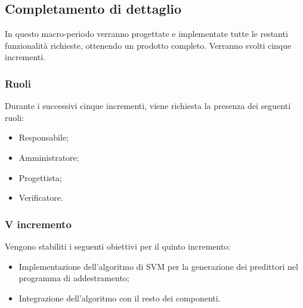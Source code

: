 \documentclass[../piano-di-progetto.tex]{subfiles}
\begin{document}
\subsection{Completamento di dettaglio}
In questo macro-periodo verranno progettate e implementate tutte le restanti funzionalità richieste, ottenendo un prodotto completo. Verranno svolti cinque incrementi.
\subsubsection{Ruoli}
Durante i successivi cinque incrementi, viene richiesta la presenza dei seguenti ruoli:
\begin{itemize}
    \item Responsabile;
    \item Amministratore;
    \item Progettista;
    \item Verificatore.
\end{itemize}



\subsubsection{V incremento}

 Vengono stabiliti i seguenti obiettivi per il quinto incremento:
 \begin{itemize}
     \item Implementazione dell'algoritmo di SVM per la generazione dei predittori nel programma di addestramento;
     \item Integrazione dell'algoritmo con il resto dei componenti.
 \end{itemize}
\end{document}
